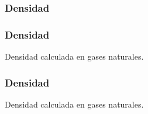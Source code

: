 \documentclass[aspectratio=1610,multi,rgb]{beamer}
\begin{document}
\subsubsection{Densidad}
\begin{frame}
	\frametitle{Densidad}
	Densidad calculada en gases naturales.
\end{frame}
\begin{frame}
	\frametitle{Densidad}
	Densidad calculada en gases naturales.
\end{frame}
\end{document}
